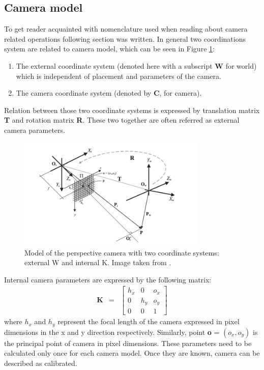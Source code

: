 \subsection{Camera model}
To get reader acquainted with nomenclature used when reading about camera related operations following section was written. In general two coordinations system are related to camera model, which can be seen in Figure \ref{fig:camera_model}:
\begin{enumerate} 
\item The external coordinate system (denoted here with a subscript \textbf{W} for world) which is independent of placement and parameters of the camera.
\item The camera coordinate system (denoted by \textbf{C}, for camera).
\end{enumerate}
Relation between those two coordinate systems is expressed by translation matrix \textbf{T} and rotation matrix \textbf{R}. These two together are often referred as external camera parameters.
\begin{figure}[h!]
    \centering
    \includegraphics[width=0.8\textwidth]{camera_model}
    \caption{Model of the perspective camera with two coordinate systems: external W and
internal K. Image taken from \cite{Cyganek3dVision}.}
    \label{fig:camera_model}
\end{figure}
Internal camera parameters are expressed by the following matrix:
\begin{equation}
\begin{array}{lcl}
\textbf{K} & = &
\begin{bmatrix}
h_{x} & 0 & o_{x} \\ 
0 & h_{y} & o_{y} \\ 
0 & 0 & 1
\end{bmatrix}
\end{array}
\end{equation}
where $h_{x}$ and $h_{y}$ represent the focal length of the camera expressed in pixel dimensions in the x and y direction respectively. Similarly, point \textbf{o} = $(o_{x},o_{y})$ is the principal point of camera in pixel dimensions. These parameters need to be calculated only once for each camera model. Once they are known, camera can be described as calibrated. 
